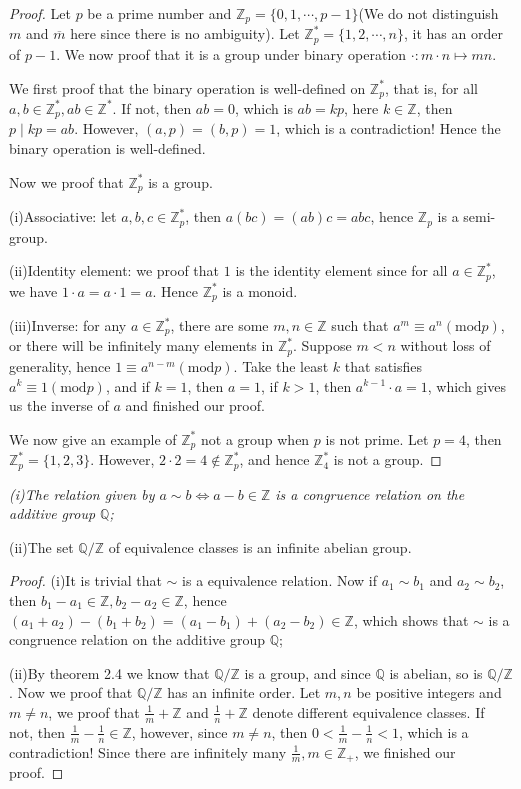 \begin{proof}
Let $p$ be a prime number and $\mathbb{Z}_p=\{0,1,\cdots,p-1\}$(We do not distinguish $m$ and $\overline{m}$ here since there is no ambiguity). Let $\mathbb{Z}_p^*=\{1,2,\cdots,n\}$, it has an order of $p-1$. We now proof that it is a group under binary operation $\cdot:m\cdot n\mapsto mn$.\par
We first proof that the binary operation is well-defined on $\mathbb{Z}_p^*$, that is, for all $a,b\in\mathbb{Z}_p^*,ab\in\mathbb{Z}^*$. If not, then $ab=0$, which is $ab=kp$, here $k\in\mathbb{Z}$, then $p\mid kp=ab$. However, $(a,p)=(b,p)=1$, which is a contradiction! Hence the binary operation is well-defined.\par
Now we proof that $\mathbb{Z}_p^*$ is a group.\par
(i)Associative: let $a,b,c\in\mathbb{Z}_p^*$, then $a(bc)=(ab)c=abc$, hence $\mathbb{Z}_p$ is a semi-group.\par
(ii)Identity element: we proof that $1$ is the identity element since for all $a\in\mathbb{Z}_p^*$, we have $1\cdot a=a\cdot 1=a$. Hence $\mathbb{Z}_p^*$ is a monoid.\par
(iii)Inverse: for any $a\in\mathbb{Z}_p^*$, there are some $m,n\in\mathbb{Z}$ such that $a^m\equiv a^n(\mathrm{mod} p)$, or there will be infinitely many elements in $\mathbb{Z}_p^*$. Suppose $m<n$ without loss of generality, hence $1\equiv a^{n-m}(\mathrm{mod}p)$. Take the least $k$ that satisfies $a^k\equiv 1(\mathrm{mod} p)$, and if $k=1$, then $a=1$, if $k>1$, then $a^{k-1}\cdot a=1$, which gives us the inverse of $a$ and finished our proof.\par
We now give an example of $\mathbb{Z}_p^*$ not a group when $p$ is not prime. Let $p=4$, then $\mathbb{Z}_p^*=\{1,2,3\}$. However, $2\cdot 2=4\notin\mathbb{Z}_p^*$, and hence $\mathbb{Z}_4^*$ is not a group.
\end{proof}
\begin{problem}\em
(i)The relation given by $a\sim b\Leftrightarrow a-b\in\mathbb{Z}$ is a congruence relation on the additive group $\mathbb{Q}$;\par
(ii)The set $\mathbb{Q}/\mathbb{Z}$ of equivalence classes is an infinite abelian group.
\end{problem}
\begin{proof}
(i)It is trivial that $\sim$ is a equivalence relation. Now if $a_1\sim b_1$ and $a_2\sim b_2$, then $b_1-a_1\in\mathbb{Z},b_2-a_2\in\mathbb{Z}$, hence $(a_1+a_2)-(b_1+b_2)=(a_1-b_1)+(a_2-b_2)\in\mathbb{Z}$, which shows that $\sim$ is a congruence relation on the additive group $\mathbb{Q}$;\par
(ii)By theorem 2.4 we know that $\mathbb{Q}/\mathbb{Z}$ is a group, and since $\mathbb{Q}$ is abelian, so is $\mathbb{Q}/\mathbb{Z}$. Now we proof that $\mathbb{Q}/\mathbb{Z}$ has an infinite order. Let $m,n$ be positive integers and $m\ne n$, we proof that $\frac{1}{m}+\mathbb{Z}$ and $\frac{1}{n}+\mathbb{Z}$ denote different equivalence classes. If not, then $\frac{1}{m}-\frac{1}{n}\in\mathbb{Z}$, however, since $m\ne n$, then $0<\frac{1}{m}-\frac{1}{n}<1$, which is a contradiction! Since there are infinitely many $\frac{1}{m},m\in\mathbb{Z}_+$, we finished our proof.
\end{proof}
